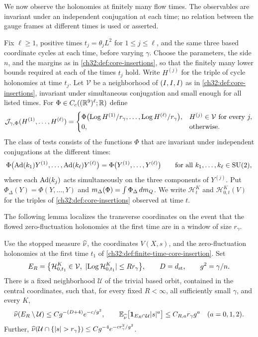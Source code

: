 We now observe the holonomies at finitely many flow times. The observables are invariant under an independent conjugation at each time; no relation between the gauge frames at different times is used or asserted.

\begin{definition}\label{ch32:def:finite-time-core-insertion}
Fix $\ell\ge1$, positive times $t_j=\theta_jL^2$ for $1\le j\le\ell$, and the same three based coordinate cycles at each time, before varying $\gamma$. Choose the parameters, the side $n$, and the margins as in \cref{ch32:def:core-insertions}, so that the finitely many lower bounds required at each of the times $t_j$ hold. Write $H^{(j)}$ for the triple of cycle holonomies at time $t_j$. Let $\mathcal V$ be a neighborhood of $(I,I,I)$ as in \cref{ch32:def:core-insertions}, invariant under simultaneous conjugation and small enough for all listed times. For $\Phi\in C_c((\mathbb R^9)^\ell;\mathbb R)$ define
\[
 \mathcal J_{\gamma,\Phi}(H^{(1)},\dots,H^{(\ell)})=
 \begin{cases}
 \Phi\bigl(\operatorname{Log} H^{(1)}/r_\gamma,\dots,\operatorname{Log} H^{(\ell)}/r_\gamma\bigr),&H^{(j)}\in\mathcal V\text{ for every }j,\\
 0,&\text{otherwise}.
 \end{cases}
\]
The class of tests consists of the functions $\Phi$ that are invariant under independent conjugations at the different times:
\[
 \Phi\bigl(\operatorname{Ad}(k_1)Y^{(1)},\dots,\operatorname{Ad}(k_\ell)Y^{(\ell)}\bigr)=\Phi\bigl(Y^{(1)},\dots,Y^{(\ell)}\bigr)\qquad\text{for all }k_1,\dots,k_\ell\in\mathrm{SU}(2),
\]
where each $\operatorname{Ad}(k_j)$ acts simultaneously on the three components of $Y^{(j)}$. Put $\Phi_\Delta(Y)=\Phi(Y,\dots,Y)$ and $m_\Delta(\Phi)=\int\Phi_\Delta\,dm_Q$. We write $\mathcal H^K_{t}$ and $\mathcal H^K_{0,t}(V)$ for the triples of \cref{ch32:def:core-insertions} observed at time $t$.
\end{definition}

The following lemma localizes the transverse coordinates on the event that the flowed zero-fluctuation holonomies at the first time are in a window of size $r_\gamma$.

\begin{lemma}\label{ch32:lem:localized-stiff-core-moment}
Use the stopped measure $\widehat\nu$, the coordinates $V(X,s)$, and the zero-fluctuation holonomies at the first time $t_1$ of \cref{ch32:def:finite-time-core-insertion}. Set
\[
 E_R=\bigl\{\mathcal H^K_{0,t_1}\in\mathcal V,\ \lvert \operatorname{Log}\mathcal H^K_{0,t_1}\rvert\le Rr_\gamma\bigr\},\qquad D=d_{\mathrm{st}},\qquad g^2=\gamma/n.
\]
There is a fixed neighborhood $\mathcal U$ of the trivial based orbit, contained in the central coordinates, such that, for every fixed $R<\infty$, all sufficiently small $\gamma$, and every $K$,
\[
 \widehat\nu(E_R\setminus\mathcal U)\le Cg^{-(D+4)}e^{-c/g^2},\qquad\mathbb E_{\widehat\nu}\bigl[\mathbf 1_{E_R\cap\mathcal U}\lvert s\rvert^a\bigr]\le C_{R,a}r_\gamma g^a\quad(a=0,1,2).
\]
Further, $\widehat\nu(\mathcal U\cap\{\lvert s\rvert>r_\gamma\})\le Cg^{-4}e^{-cr_\gamma^2/g^2}$.
\end{lemma}

